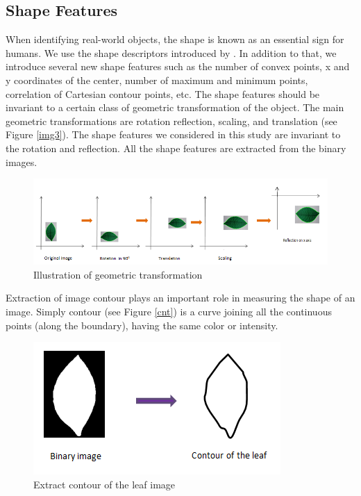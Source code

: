 \documentclass{article}
\begin{document}
\hypertarget{shape-features}{%
\subsection{Shape Features}\label{shape-features}}

When identifying real-world objects, the shape is known as an
essential sign for humans. We use the shape descriptors introduced by
\citep{articlee}. In addition to that, we introduce several
new shape features such as the number of convex points, x and y coordinates
of the center, number of maximum and minimum points, correlation of
Cartesian contour points, etc. The shape features should be invariant to
a certain class of geometric transformation of the object. The main
geometric transformations are rotation reflection, scaling, and
translation (see Figure \ref{img3}). The shape features we considered in
this study are invariant to the rotation and reflection. All the shape
features are extracted from the binary images.

\begin{figure}[!ht]

{\centering \includegraphics[width=0.7\linewidth]{Figures/geomatric_transformation} 

}

\caption{\label{img3} Illustration of geometric transformation}\label{fig:unnamed-chunk-5}
\end{figure}

Extraction of image contour plays an important role in measuring the
shape of an image. Simply contour (see Figure \ref{cnt}) is a curve
joining all the continuous points (along the boundary), having the same
color or intensity.

\begin{figure}[!ht]

{\centering \includegraphics[width=0.3\linewidth]{Figures/cnt} 

}

\caption{\label{cnt}Extract contour of the leaf image}\label{fig:unnamed-chunk-6}
\end{figure}
\end{document}
